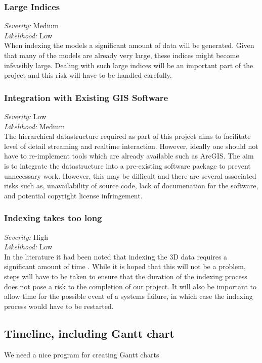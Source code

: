 \documentclass[12pt,a4paper]{article}
\begin{document}
\subsubsection*{Large Indices}
\noindent \textit{Severity: } Medium \\
\noindent \textit{Likelihood: } Low \\
When indexing the models a significant amount of data will be generated.
Given that many of the models are already very large, these indices might
become infeasibly large. Dealing with such large indices will be an important
part of the project and this risk will have to be handled carefully.
\subsubsection*{Integration with Existing GIS Software}
\noindent \textit{Severity: } Low \\
\noindent \textit{Likelihood: } Medium \\
The hierarchical datastructure required as part of this project aims to facilitate level
of detail streaming and realtime interaction. However, ideally one should not have to
re-implement tools which are already available such as ArcGIS. The aim is to integrate
the datastructure into a pre-existing software package to prevent unnecessary work.
However, this may be difficult and there are several associated risks such as,
unavailability of source code, lack of documenation for the software, and potential
copyright license infringement.
\subsubsection*{Indexing takes too long}
\noindent \textit{Severity: } High \\
\noindent \textit{Likelihood: } Low \\
In the literature it had been noted that indexing the 3D data requires a significant
amount of time \cite{interactivepointclouds}. While it is hoped that this will not be
a problem, steps will have to be taken to ensure that the duration of the indexing
process does not pose a risk to the completion of our project. It will also be important
to allow time for the possible event of a systems failure, in which case the indexing
process would have to be restarted.
\subsection{Timeline, including Gantt chart}
We need a nice program for creating Gantt charts
\end{document}
